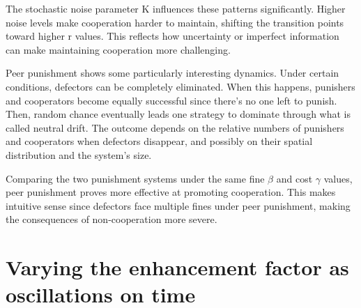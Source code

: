 The stochastic noise parameter K influences these patterns significantly. Higher noise levels make cooperation harder to maintain, shifting the transition points toward higher r values. This reflects how uncertainty or imperfect information can make maintaining cooperation more challenging.

Peer punishment shows some particularly interesting dynamics. Under certain conditions, defectors can be completely eliminated. When this happens, punishers and cooperators become equally successful since there's no one left to punish. Then, random chance eventually leads one strategy to dominate through what is called neutral drift. The outcome depends on the relative numbers of punishers and cooperators when defectors disappear, and possibly on their spatial distribution and the system's size.

Comparing the two punishment systems under the same fine $\beta$ and cost $\gamma$ values, peer punishment proves more effective at promoting cooperation. This makes intuitive sense since defectors face multiple fines under peer punishment, making the consequences of non-cooperation more severe.




\section{Varying the enhancement factor as oscillations on time}
\label{3oscillating}


